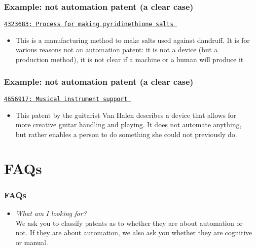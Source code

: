 \documentclass[10pt]{beamer}
\begin{document}
\begin{frame}\frametitle{Example: \textcolor{myred}{\textbf{not}} automation patent (a clear case)}
\href{https://www.google.de/patents/US4323683}{\texttt{4323683: Process for making pyridinethione salts }}
	\begin{itemize}	
	\item This is a manufacturing method to make salts used against dandruff. It is for various reasons not an automation patent: it is not a device (but a production method), it is not clear if a machine or a human will produce it 
	\end{itemize}
\end{frame}


\begin{frame}\frametitle{Example: \textcolor{myred}{\textbf{not}} automation patent (a clear case)}
\href{http://www.google.com/patents/US4656917}{\texttt{4656917: Musical instrument support }}
	\begin{itemize}	
	\item This patent by the guitarist Van Halen describes a device that allows for more creative guitar handling and playing. It does not automate anything, but rather enables a person to do something she could not previously do.
	\end{itemize}
\end{frame}





\section{FAQs}
\setcounter{subsection}{1} %



\begin{frame}\frametitle{FAQs}
	\begin{itemize}	
	\item \textit{What am I looking for?}\\[0.1cm]
	We ask you to classify patents as to whether they are about automation or not. If they are about automation, we also ask you whether they are cognitive or manual.
	\end{itemize}
\end{frame}
\end{document}
